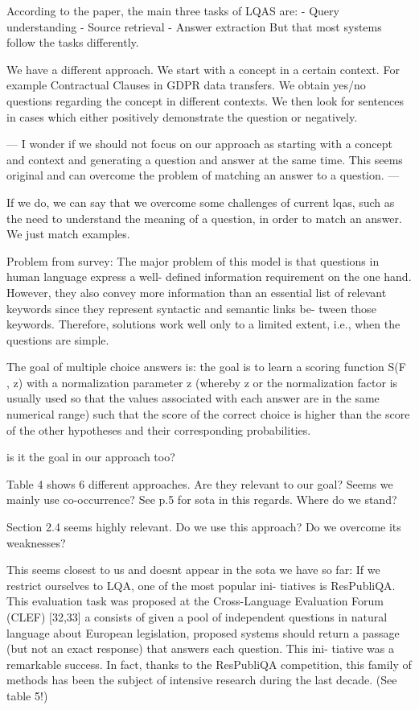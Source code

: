 According to the paper, the main three tasks of LQAS are:
- Query understanding
- Source retrieval
- Answer extraction
But that most systems follow the tasks differently.

We have a different approach. We start with a concept in a certain context. For example Contractual Clauses in GDPR data transfers. We obtain yes/no questions regarding the concept in different contexts. We then look for sentences in cases which either positively demonstrate the question or negatively.

---
I wonder if we should not focus on our approach as starting with a concept and context and generating a question and answer at the same time. This seems original and can overcome the problem of matching an answer to a question.
---

If we do, we can say that we overcome some challenges of current lqas, such as the need to understand the meaning of a question, in order to match an answer. We just match examples.

Problem from survey: The major problem of
this model is that questions in human language express a well-
defined information requirement on the one hand. However, they
also convey more information than an essential list of relevant
keywords since they represent syntactic and semantic links be-
tween those keywords. Therefore, solutions work well only to a
limited extent, i.e., when the questions are simple.

The goal of multiple choice answers is: the goal is to learn a scoring function S(F , z) with a
normalization parameter z (whereby z or the normalization factor
is usually used so that the values associated with each answer are
in the same numerical range) such that the score of the correct
choice is higher than the score of the other hypotheses and their
corresponding probabilities.

is it the goal in our approach too?

Table 4 shows 6 different approaches. Are they relevant to our goal? Seems we mainly use co-occurrence? See p.5 for sota in this regards. Where do we stand?

Section 2.4 seems highly relevant. Do we use this approach? Do we overcome its weaknesses?

This seems closest to us and doesnt appear in the sota we have so far: If we restrict ourselves to LQA, one of the most popular ini-
tiatives is ResPubliQA. This evaluation task was proposed at the
Cross-Language Evaluation Forum (CLEF) [32,33] a consists of
given a pool of independent questions in natural language about
European legislation, proposed systems should return a passage
(but not an exact response) that answers each question. This ini-
tiative was a remarkable success. In fact, thanks to the ResPubliQA
competition, this family of methods has been the subject of
intensive research during the last decade. (See table 5!)

